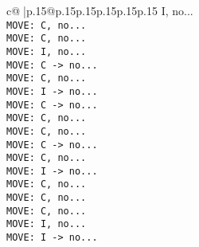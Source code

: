 \documentclass{article}
\begin{document}
{\begin{supertabular}{c@{$\;$}|p{.15\linewidth}@{}p{.15\linewidth}p{.15\linewidth}p{.15\linewidth}p{.15\linewidth}p{.15\linewidth}}
{{{I, no...\\ \tt  MOVE: C, no...\\ \tt  MOVE: C, no...\\ \tt  MOVE: I, no...\\ \tt  MOVE: C -> no...\\ \tt  MOVE: C, no...\\ \tt  MOVE: I -> no...\\ \tt  MOVE: C -> no...\\ \tt  MOVE: C, no...\\ \tt  MOVE: C, no...\\ \tt  MOVE: C -> no...\\ \tt  MOVE: C, no...\\ \tt  MOVE: I -> no...\\ \tt  MOVE: C, no...\\ \tt  MOVE: C, no...\\ \tt  MOVE: C, no...\\ \tt  MOVE: I, no...\\ \tt  MOVE: I -> no...\\ \tt }}}
\end{supertabular}}
\end{document}
